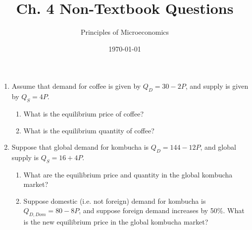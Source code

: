 \documentclass{article}
\title{Ch. 4 Non-Textbook Questions}
\author{Principles of Microeconomics}
\date{\today}
\begin{document}
\maketitle

\begin{enumerate}

\item Assume that demand for coffee is given by $Q_D = 30 - 2P$, and supply is given by $Q_S = 4P$.

	\begin{enumerate}
	
	\item What is the equilibrium price of coffee?
	
	\item What is the equilibrium quantity of coffee?
	
	\end{enumerate}
	
\item Suppose that global demand for kombucha is $Q_D = 144 - 12P$, and global supply is $Q_S = 16 + 4P$.

	\begin{enumerate}
	
	\item What are the equilibrium price and quantity in the global kombucha market?
	
	\item Suppose domestic (i.e. not foreign) demand for kombucha is $Q_{D,Dom} = 80 - 8P$, and suppose foreign demand increases by 50\%. What is the new equilibrium price in the global kombucha market?
	
	\end{enumerate}

\end{enumerate}
\end{document}
